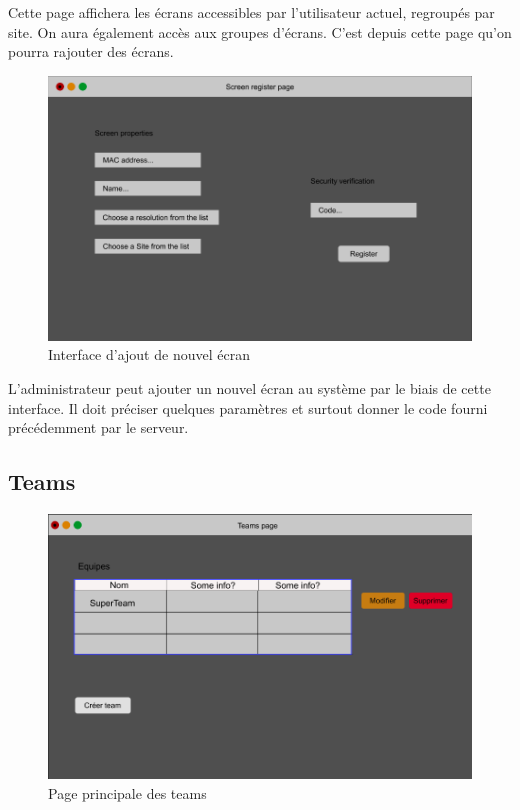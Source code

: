 \documentclass[french]{article}
\begin{document}
\begin{appendices}
	Cette page affichera les écrans accessibles par l'utilisateur actuel, regroupés par site. On aura également accès aux groupes d'écrans. C'est depuis cette page qu'on pourra rajouter des écrans.
	
	\begin{figure}[h]
		\centering
		\includegraphics[scale=0.3]{mockup/m_screen_register}
		\caption{Interface d'ajout de nouvel écran}
		\label{fig:screenRegister}
	\end{figure}
	
	L'administrateur peut ajouter un nouvel écran au système par le biais de cette interface. Il doit préciser quelques paramètres et surtout donner le code fourni précédemment par le serveur.
	
\newpage
\subsection{Teams}

	\begin{figure}[ht!]
		\centering
		\includegraphics[scale=0.3]{mockup/m_teams_page}
		\caption{Page principale des teams}
		\label{fig:teamPage}
	\end{figure}
	

\end{appendices}
\end{document}
